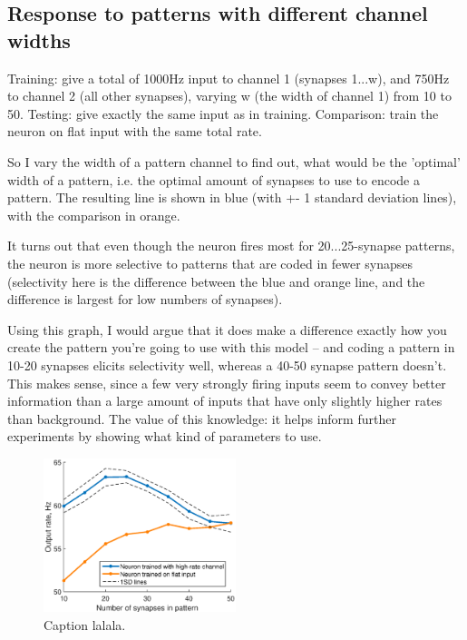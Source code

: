 \documentclass[a4paper,12pt]{report}
\theoremstyle{definition}
\begin{document}
\clearpage %
\subsection{Response to patterns with different channel widths}
\label{subsec:patternwidths}

Training: give a total of 1000Hz input to channel 1 (synapses 1...w), and 750Hz to channel 2 (all other synapses), varying w (the width of channel 1) from 10 to  50.
Testing: give exactly the same input as in training.
Comparison: train the neuron on flat input with the same total rate.

So I vary the width of a pattern channel to find out, what would be the 'optimal' width of a pattern, i.e. the optimal amount of synapses to use to encode a pattern. The resulting line is shown in blue (with +- 1 standard deviation lines), with the comparison in orange.

It turns out that even though the neuron fires most for 20...25-synapse patterns, the neuron is more selective to patterns that are coded in fewer synapses (selectivity here is the difference between the blue and orange line, and the difference is largest for low numbers of synapses).

Using this graph, I would argue that it does make a difference exactly how you create the pattern you're going to use with this model -- and coding a pattern in 10-20 synapses elicits selectivity well, whereas a 40-50 synapse pattern doesn't. This makes sense, since a few very strongly firing inputs seem to convey better information than a large amount of inputs that have only slightly higher rates than background.
The value of this knowledge: it helps inform further experiments by showing what kind of parameters to use.

\begin{figure}[h]
    \centering
    \includegraphics[width=0.5\textwidth]{figures/exp4_synapsecount.eps}
    \caption{Caption lalala.}
    \label{fig:exp4synapsecount}
\end{figure}
\end{document}
